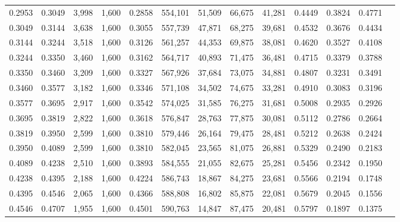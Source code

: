 \begin{tabular}{rrrrrrrrrrrrr}
0.2953 & 0.3049 &  3,998 & 1,600 &                                     0.2858 & 554,101 &  51,509 &  66,675 &  41,281 & 0.4449 & 0.3824 & 0.4771 \\
0.3049 & 0.3144 &  3,638 & 1,600 &                                     0.3055 & 557,739 &  47,871 &  68,275 &  39,681 & 0.4532 & 0.3676 & 0.4434 \\
0.3144 & 0.3244 &  3,518 & 1,600 &                                     0.3126 & 561,257 &  44,353 &  69,875 &  38,081 & 0.4620 & 0.3527 & 0.4108 \\
0.3244 & 0.3350 &  3,460 & 1,600 &                                     0.3162 & 564,717 &  40,893 &  71,475 &  36,481 & 0.4715 & 0.3379 & 0.3788 \\
0.3350 & 0.3460 &  3,209 & 1,600 &                                     0.3327 & 567,926 &  37,684 &  73,075 &  34,881 & 0.4807 & 0.3231 & 0.3491 \\
0.3460 & 0.3577 &  3,182 & 1,600 &                                     0.3346 & 571,108 &  34,502 &  74,675 &  33,281 & 0.4910 & 0.3083 & 0.3196 \\
0.3577 & 0.3695 &  2,917 & 1,600 &                                     0.3542 & 574,025 &  31,585 &  76,275 &  31,681 & 0.5008 & 0.2935 & 0.2926 \\
0.3695 & 0.3819 &  2,822 & 1,600 &                                     0.3618 & 576,847 &  28,763 &  77,875 &  30,081 & 0.5112 & 0.2786 & 0.2664 \\
0.3819 & 0.3950 &  2,599 & 1,600 &                                     0.3810 & 579,446 &  26,164 &  79,475 &  28,481 & 0.5212 & 0.2638 & 0.2424 \\
0.3950 & 0.4089 &  2,599 & 1,600 &                                     0.3810 & 582,045 &  23,565 &  81,075 &  26,881 & 0.5329 & 0.2490 & 0.2183 \\
0.4089 & 0.4238 &  2,510 & 1,600 &                                     0.3893 & 584,555 &  21,055 &  82,675 &  25,281 & 0.5456 & 0.2342 & 0.1950 \\
0.4238 & 0.4395 &  2,188 & 1,600 &                                     0.4224 & 586,743 &  18,867 &  84,275 &  23,681 & 0.5566 & 0.2194 & 0.1748 \\
0.4395 & 0.4546 &  2,065 & 1,600 &                                     0.4366 & 588,808 &  16,802 &  85,875 &  22,081 & 0.5679 & 0.2045 & 0.1556 \\
0.4546 & 0.4707 &  1,955 & 1,600 &                                     0.4501 & 590,763 &  14,847 &  87,475 &  20,481 & 0.5797 & 0.1897 & 0.1375 \\

\end{tabular}
